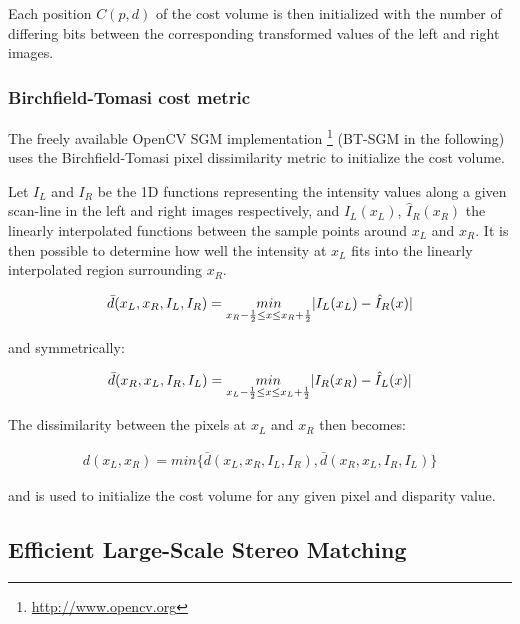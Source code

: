 Each position $C(p, d)$ of the cost volume is then initialized with the number of differing bits between the corresponding transformed values of the left and right images.

\subsubsection{Birchfield-Tomasi cost metric}\label{ch:chapter03_03_01_02}

The freely available OpenCV SGM implementation \footnote{\url{http://www.opencv.org}} (BT-SGM in the following) uses the Birchfield-Tomasi pixel dissimilarity metric \citep{Birchfield1998} to initialize the cost volume.

Let $I_L$ and $I_R$ be the 1D functions representing the intensity values along a given scan-line in the left and right images respectively, and $\hat{I}_L(x_L)$, $\hat{I}_R(x_R)$ the linearly interpolated functions between the sample points around $x_L$ and $x_R$. It is then possible to determine how well the intensity at $x_L$ fits into the linearly interpolated region surrounding $x_R$.

\begin{align}\label{eq:cp03_birchfield_tomasi_l_in_r}
\bar{d}(x_L, x_R, I_L, I_R) = \underset{x_R - {1 \over 2} \leq x \leq x_R + {1 \over 2}}{min} | I_L(x_L) - \hat{I}_R(x)|
\end{align}

and symmetrically:

\begin{align}\label{eq:cp03_birchfield_tomasi_r_in_l}
\bar{d}(x_R, x_L, I_R, I_L) = \underset{x_L - {1 \over 2} \leq x \leq x_L + {1 \over 2}}{min} | I_R(x_R) - \hat{I}_L(x)|
\end{align}

The dissimilarity between the pixels at $x_L$ and $x_R$ then becomes:

\begin{align}\label{eq:cp03_birchfield_tomasi}
d(x_L, x_R) = min \{ \bar{d}(x_L, x_R, I_L, I_R), \bar{d}(x_R, x_L, I_R, I_L) \}
\end{align}

and is used to initialize the cost volume for any given pixel and disparity value.


\subsection{Efficient Large-Scale Stereo Matching}\label{ch:chapter03_03_02}

